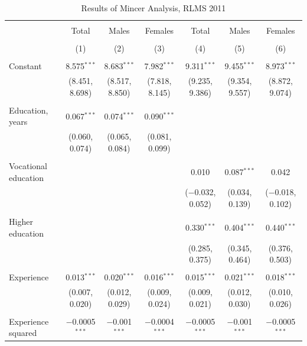 \documentclass[alpha-refs]{wiley-article-01g}
\begin{document}
\begin{landscape}
	
	\fontsize{9}{11}
	\selectfont
	
	\begin{table}[!htbp] \centering 
\renewcommand{\arraystretch}{1.0}
		\caption{Results of Mincer Analysis, RLMS 2011} 
		\label{} 
		\begin{tabular}{@{\extracolsep{5pt}}lcccccc} 
			\\[-.8ex]\hline 
			\hline \\[-.8ex] 
			& Total & Males & Females & Total & Males & Females \\ 
			\\[-.8ex] & (1) & (2) & (3) & (4) & (5) & (6)\\ 
			\hline \\[-.8ex] 
			Constant & 8.575$^{***}$ & 8.683$^{***}$ & 7.982$^{***}$ & 9.311$^{***}$ & 9.455$^{***}$ & 8.973$^{***}$ \\ 
			& (8.451, 8.698) & (8.517, 8.850) & (7.818, 8.145) & (9.235, 9.386) & (9.354, 9.557) & (8.872, 9.074) \\ 
			& & & & & & \\ 
			Education, years & 0.067$^{***}$ & 0.074$^{***}$ & 0.090$^{***}$ &  &  &  \\ 
			& (0.060, 0.074) & (0.065, 0.084) & (0.081, 0.099) &  &  &  \\ 
			& & & & & & \\ 
			Vocational education &  &  &  & 0.010 & 0.087$^{***}$ & 0.042 \\ 
			&  &  &  & ($-$0.032, 0.052) & (0.034, 0.139) & ($-$0.018, 0.102) \\ 
			& & & & & & \\ 
			Higher education &  &  &  & 0.330$^{***}$ & 0.404$^{***}$ & 0.440$^{***}$ \\ 
			&  &  &  & (0.285, 0.375) & (0.345, 0.464) & (0.376, 0.503) \\ 
			& & & & & & \\ 
			Experience & 0.013$^{***}$ & 0.020$^{***}$ & 0.016$^{***}$ & 0.015$^{***}$ & 0.021$^{***}$ & 0.018$^{***}$ \\ 
			& (0.007, 0.020) & (0.012, 0.029) & (0.009, 0.024) & (0.009, 0.021) & (0.012, 0.030) & (0.010, 0.026) \\ 
			& & & & & & \\ 
			Experience squared & $-$0.0005$^{***}$ & $-$0.001$^{***}$ & $-$0.0004$^{***}$ & $-$0.0005$^{***}$ & $-$0.001$^{***}$ & $-$0.0005$^{***}$ \\ 

\end{tabular}
\end{table}
\end{landscape}
\end{document}
